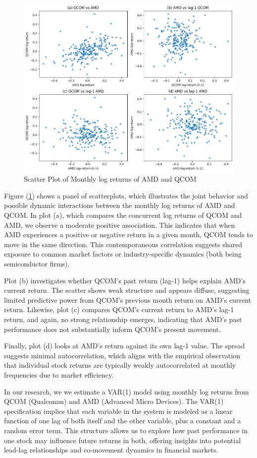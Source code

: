 \documentclass[12pt]{article}
\begin{document}
\begin{figure}[!h]
	\centering
	\includegraphics[width=0.8\linewidth]{plots/amd_qcom_scatter.png}
	\caption{Scatter Plot of Monthly log returns of AMD and QCOM}
	\label{fig:amd_qcom_scatter}
\end{figure}

Figure (\ref{fig:amd_qcom_scatter}) shows a panel of scatterplots, which illustrates the joint behavior and possible dynamic interactions between the monthly log returns of AMD and QCOM. In plot (a), which compares the concurrent log returns of QCOM and AMD, we observe a moderate positive association. This indicates that when AMD experiences a positive or negative return in a given month, QCOM tends to move in the same direction. This contemporaneous correlation suggests shared exposure to common market factors or industry-specific dynamics (both being semiconductor firms).

Plot (b) investigates whether QCOM’s past return (lag-1) helps explain AMD’s current return. The scatter shows weak structure and appears diffuse, suggesting limited predictive power from QCOM’s previous month return on AMD's current return. Likewise, plot (c) compares QCOM’s current return to AMD’s lag-1 return, and again, no strong relationship emerges, indicating that AMD’s past performance does not substantially inform QCOM’s present movement.

Finally, plot (d) looks at AMD's return against its own lag-1 value. The spread suggests minimal autocorrelation, which aligns with the empirical observation that individual stock returns are typically weakly autocorrelated at monthly frequencies due to market efficiency.

In our research, we we estimate a VAR(1) model using monthly log returns from QCOM (Qualcomm) and AMD (Advanced Micro Devices). The VAR(1) specification implies that each variable in the system is modeled as a linear function of one lag of both itself and the other variable, plus a constant and a random error term. This structure allows us to explore how past performance in one stock may influence future returns in both, offering insights into potential lead-lag relationships and co-movement dynamics in financial markets.
\end{document}
